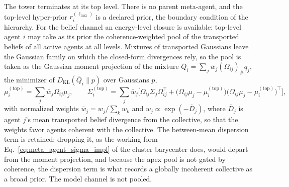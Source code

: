 The tower terminates at its top level. There is no parent meta-agent, and the top-level hyper-prior $r_i^{(\ell_{\max})}$ is a declared prior, the boundary condition of the hierarchy. For the belief channel an energy-level closure is available: top-level agent $i$ may take as its prior the coherence-weighted pool of the transported beliefs of all active agents at all levels. Mixtures of transported Gaussians leave the Gaussian family on which the closed-form divergences rely, so the pool is taken as the Gaussian moment projection of the mixture $\bar Q_i = \sum_j \bar w_j (\Omega_{ij})_{\#} q_j$, the minimizer of $D_{\mathrm{KL}}(\bar Q_i \| p)$ over Gaussians $p$,
\begin{equation}
\mu_i^{(\mathrm{top})} = \sum_j \bar w_j \Omega_{ij}\mu_j,
\qquad
\Sigma_i^{(\mathrm{top})} = \sum_j \bar w_j \Big[\Omega_{ij} \Sigma_j \Omega_{ij}^\top + \big(\Omega_{ij}\mu_j - \mu_i^{(\mathrm{top})}\big)\big(\Omega_{ij}\mu_j - \mu_i^{(\mathrm{top})}\big)^\top\Big],
\end{equation}
with normalized weights $\bar w_j = w_j / \sum_k w_k$ and $w_j \propto \exp(-\bar D_j)$, where $\bar D_j$ is agent $j$'s mean transported belief divergence from the collective, so that the weights favor agents coherent with the collective. The between-mean dispersion term is retained: dropping it, as the working form Eq.~\eqref{eq:meta_agent_sigma_impl} of the cluster barycenter does, would depart from the moment projection, and because the apex pool is not gated by coherence, the dispersion term is what records a globally incoherent collective as a broad prior. The model channel is not pooled.


